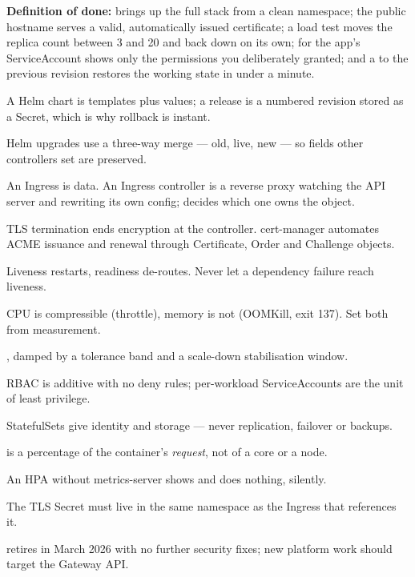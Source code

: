 \begin{buildalong}
\begin{wbitem}
\end{wbitem}
\smallskip\textbf{Definition of done:}  brings up the full stack from a clean namespace; the public hostname serves a valid, automatically issued certificate; a load test moves the replica count between 3 and 20 and back down on its own;  for the app's ServiceAccount shows only the permissions you deliberately granted; and a  to the previous revision restores the working state in under a minute.
\end{buildalong}


\begin{tickcheck}
  \item A Helm chart is templates plus values; a release is a numbered revision stored as a Secret, which is why rollback is instant.
  \item Helm upgrades use a three-way merge --- old, live, new --- so fields other controllers set are preserved.
  \item An Ingress is data. An Ingress controller is a reverse proxy watching the API server and rewriting its own config;  decides which one owns the object.
  \item TLS termination ends encryption at the controller. cert-manager automates ACME issuance and renewal through Certificate, Order and Challenge objects.
  \item Liveness restarts, readiness de-routes. Never let a dependency failure reach liveness.
  \item CPU is compressible (throttle), memory is not (OOMKill, exit 137). Set both from measurement.
  \item {}, damped by a tolerance band and a scale-down stabilisation window.
  \item RBAC is additive with no deny rules; per-workload ServiceAccounts are the unit of least privilege.
  \item StatefulSets give identity and storage --- never replication, failover or backups.
\end{tickcheck}

\begin{wbitem}
  \item {} is a percentage of the container's \emph{request}, not of a core or a node.
  \item An HPA without metrics-server shows  and does nothing, silently.
  \item The TLS Secret must live in the same namespace as the Ingress that references it.
  \item {} retires in March 2026 with no further security fixes; new platform work should target the Gateway API.
\end{wbitem}

